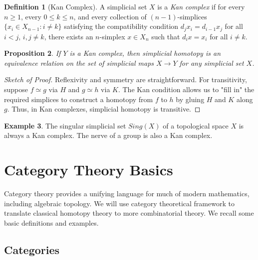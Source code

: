 \documentclass[11pt]{article}
\theoremstyle{definition}
\newtheorem{definition}{Definition}[section]
\newtheorem{example}[definition]{Example}
\theoremstyle{plain}
\newtheorem{proposition}[definition]{Proposition}
\begin{document}
\begin{definition}[Kan Complex]
    A simplicial set $X$ is a \emph{Kan complex} if for every $n \geq 1$, every $0 \leq k \leq n$, and every collection of $(n-1)$-simplices $\{x_i \in X_{n-1} : i \neq k\}$ satisfying the compatibility condition $d_j x_i = d_{i-1} x_j$ for all $i < j$, $i,j \neq k$, there exists an $n$-simplex $x \in X_n$ such that $d_i x = x_i$ for all $i \neq k$.
\end{definition}





\begin{proposition}
    If $Y$ is a Kan complex, then simplicial homotopy is an equivalence relation on the set of simplicial maps $X \to Y$ for any simplicial set $X$.
\end{proposition}

\begin{proof}[Sketch of Proof]
    Reflexivity and symmetry are straightforward. For transitivity, suppose $f \simeq g$ via $H$ and $g \simeq h$ via $K$. The Kan condition allows us to "fill in" the required simplices to construct a homotopy from $f$ to $h$ by gluing $H$ and $K$ along $g$. Thus, in Kan complexes, simplicial homotopy is transitive.
\end{proof}

\begin{example}
    The singular simplicial set $Sing(X)$ of a topological space $X$ is always a Kan complex. The nerve of a group is also a Kan complex.
\end{example}






\appendix


\section{Category Theory Basics}

Category theory provides a unifying language for much of modern mathematics, including algebraic topology.
We will use category theoretical framework to translate classical homotopy theory to more combinatorial theory.
We recall some basic definitions and examples.



\subsection{Categories}
\end{document}
